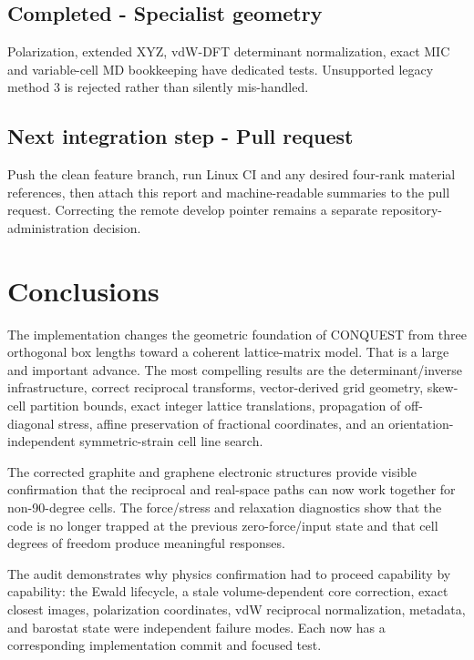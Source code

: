 \documentclass[10pt,a4paper]{report}
\begin{document}
\section{Completed - Specialist geometry}
Polarization, extended XYZ, vdW-DFT determinant normalization, exact MIC and variable-cell MD bookkeeping have dedicated tests. Unsupported legacy method 3 is rejected rather than silently mis-handled.

\section{Next integration step - Pull request}
Push the clean feature branch, run Linux CI and any desired four-rank material references, then attach this report and machine-readable summaries to the pull request. Correcting the remote develop pointer remains a separate repository-administration decision.

\chapter{Conclusions}
The implementation changes the geometric foundation of CONQUEST from three orthogonal box lengths toward a coherent lattice-matrix model. That is a large and important advance. The most compelling results are the determinant/inverse infrastructure, correct reciprocal transforms, vector-derived grid geometry, skew-cell partition bounds, exact integer lattice translations, propagation of off-diagonal stress, affine preservation of fractional coordinates, and an orientation-independent symmetric-strain cell line search.

The corrected graphite and graphene electronic structures provide visible confirmation that the reciprocal and real-space paths can now work together for non-90-degree cells. The force/stress and relaxation diagnostics show that the code is no longer trapped at the previous zero-force/input state and that cell degrees of freedom produce meaningful responses.

The audit demonstrates why physics confirmation had to proceed capability by capability: the Ewald lifecycle, a stale volume-dependent core correction, exact closest images, polarization coordinates, vdW reciprocal normalization, metadata, and barostat state were independent failure modes. Each now has a corresponding implementation commit and focused test.

\begin{center}\end{center}
\end{document}
